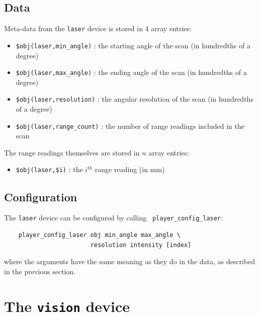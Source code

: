 \documentclass[11pt]{article}
\begin{document}
\subsection{Data}
Meta-data from the {\tt laser} device is stored in 4 array entries:
\begin{itemize}
\item {\tt \$obj(laser,min\_angle)} : the starting angle of the scan (in
hundredths of a degree)
\item {\tt \$obj(laser,max\_angle)} : the ending angle of the scan (in
hundredths of a degree)
\item {\tt \$obj(laser,resolution)} : the angular resolution of the scan (in
hundredths of a degree)
\item {\tt \$obj(laser,range\_count)} : the number of range readings included
in the scan
\end{itemize}
The range readings themselves are stored in $n$ array entries:
\begin{itemize}
\item {\tt \$obj(laser,\$i)} : the $i^{th}$ range reading (in mm)
\end{itemize}

\subsection{Configuration}
The {\tt laser} device can be configured by calling {\tt
player\_config\_laser}:
\begin{verbatim}
    player_config_laser obj min_angle max_angle \
                        resolution intensity [index]
\end{verbatim}
where the arguments have the same meaning as they do in the data, as described
in the previous section.

\section{The {\tt vision} device}
\end{document}

